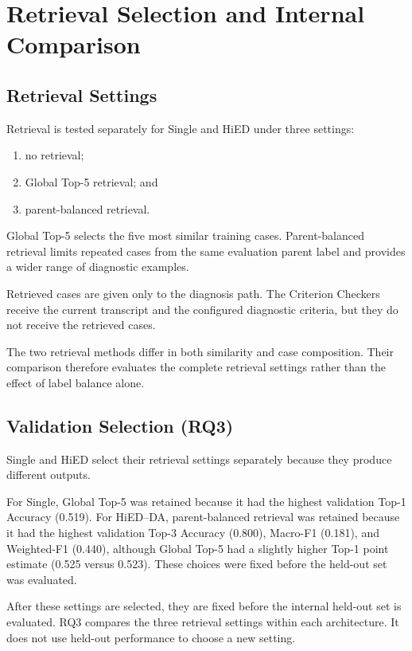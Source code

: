 \documentclass[12pt,a4paper,oneside]{report}
\begin{document}
\section{Retrieval Selection and Internal Comparison}
\label{sec:benchmark-retrieval-design}

\subsection{Retrieval Settings}

Retrieval is tested separately for Single and HiED under three settings:

\begin{enumerate}
    \item no retrieval;
    \item Global Top-5 retrieval; and
    \item parent-balanced retrieval.
\end{enumerate}

Global Top-5 selects the five most similar training cases.
Parent-balanced retrieval limits repeated cases from the same evaluation
parent label and provides a wider range of diagnostic examples.

Retrieved cases are given only to the diagnosis path. The Criterion
Checkers receive the current transcript and the configured diagnostic
criteria, but they do not receive the retrieved cases.

The two retrieval methods differ in both similarity and case
composition. Their comparison therefore evaluates the complete retrieval
settings rather than the effect of label balance alone.

\subsection{Validation Selection (RQ3)}

Single and HiED select their retrieval settings separately because they
produce different outputs.

For Single, Global Top-5 was retained because it had the highest
validation Top-1 Accuracy (0.519). For HiED--DA, parent-balanced
retrieval was retained because it had the highest validation Top-3
Accuracy (0.800), Macro-F1 (0.181), and Weighted-F1 (0.440), although
Global Top-5 had a slightly higher Top-1 point estimate (0.525 versus
0.523). These choices were fixed before the held-out set was evaluated.

After these settings are selected, they are fixed before the internal
held-out set is evaluated. RQ3 compares the three retrieval settings
within each architecture. It does not use held-out performance to choose
a new setting.
\end{document}
